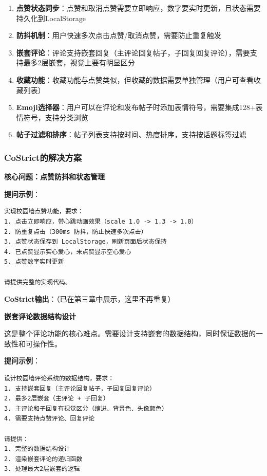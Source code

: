 ﻿\documentclass[12pt,a4paper]{article}
\begin{document}
\begin{enumerate}
    \item \textbf{点赞状态同步}：点赞和取消点赞需要立即响应，数字要实时更新，且状态需要持久化到LocalStorage
    \item \textbf{防抖机制}：用户快速多次点击点赞/取消点赞，需要防止重复触发
    \item \textbf{嵌套评论}：评论支持嵌套回复（主评论回复帖子，子回复回复评论），需要支持最多2层嵌套，视觉上要有明显区分
    \item \textbf{收藏功能}：收藏功能与点赞类似，但收藏的数据需要单独管理（用户可查看收藏列表）
    \item \textbf{Emoji选择器}：用户可以在评论和发布帖子时添加表情符号，需要集成128+表情符号，支持分类浏览
    \item \textbf{帖子过滤和排序}：帖子列表支持按时间、热度排序，支持按话题标签过滤
\end{enumerate}

\subsubsection{CoStrict的解决方案}

\textbf{核心问题：点赞防抖和状态管理}

\textbf{提问示例}：
\begin{verbatim}
实现校园墙点赞功能，要求：
1. 点击立即响应，带心跳动画效果（scale 1.0 -> 1.3 -> 1.0）
2. 防重复点击（300ms 防抖，防止快速多次点击）
3. 点赞状态保存到 LocalStorage，刷新页面后状态保持
4. 已点赞显示实心爱心，未点赞显示空心爱心
5. 点赞数字实时更新

请提供完整的实现代码。
\end{verbatim}

\textbf{CoStrict输出}：（已在第三章中展示，这里不再重复）

\textbf{嵌套评论数据结构设计}

这是整个评论功能的核心难点。需要设计支持嵌套的数据结构，同时保证数据的一致性和可操作性。

\textbf{提问示例}：
\begin{verbatim}
设计校园墙评论系统的数据结构，要求：
1. 支持嵌套回复（主评论回复帖子，子回复回复评论）
2. 最多2层嵌套（主评论 + 子回复）
3. 主评论和子回复有视觉区分（缩进、背景色、头像颜色）
4. 需要支持点赞评论、回复评论

请提供：
1. 完整的数据结构设计
2. 渲染嵌套评论的递归函数
3. 处理最大2层嵌套的逻辑
\end{verbatim}
\end{document}
